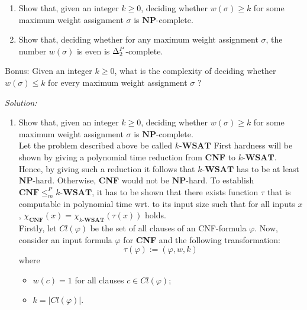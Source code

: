 \documentclass[11pt,a4paper]{article}
\newcommand{\NP}{\ensuremath{\mathbf{NP}}\xspace}
\newcommand{\DeltaP}[1]{\ensuremath{\Delta^{\protect{P}}_{#1}}\xspace}
\begin{document}
\begin{enumerate}
 \begin{enumerate}

       \item Show that, given an integer $k \geq 0$, deciding whether
            $w(\sigma)\geq k$ for some maximum weight assignment
                $\sigma$ is \NP-complete. 

                                
       \item Show that, deciding whether for any maximum weight assignment
                $\sigma$, the number $w(\sigma)$ is even is $\DeltaP{2}$-complete. 
                                
 \end{enumerate}

Bonus: Given an integer $k \geq 0$, what is the complexity of deciding whether
            $w(\sigma)\leq k$ for every maximum weight assignment
            $\sigma$ ?

 
 \bigskip

\emph{Solution:}           
           
             \begin{enumerate}

       \item Show that, given an integer $k \geq 0$, deciding whether
            $w(\sigma)\geq k$ for some maximum weight assignment
                $\sigma$ is \NP-complete. \\
       
Let the problem described above be called  $k\text{-}\textbf{WSAT}$
First hardness will be shown by giving a polynomial time reduction from {\bf CNF} to $k\text{-}\textbf{WSAT}$. Hence, by giving such a reduction it follows that $k\text{-}\textbf{WSAT}$ has to be at least \NP-hard. Otherwise, \textbf{CNF} would not be \NP-hard.
To establish $\textbf{CNF} \leq_m^P k\text{-}\textbf{WSAT}$, it has to be shown that there exists function $\tau$ that is computable in polynomial time wrt. to its input size such that for all inputs $x$, $\chi_{\textbf{CNF}} (x)= \chi_{k\text{-}\textbf{WSAT}}(\tau(x))$ holds. \\

Firstly, let $\mathit{Cl}(\varphi)$ be the set of all clauses of an CNF-formula $\varphi$. Now, consider an input formula $\varphi$ for \textbf{CNF} and the following transformation:
\begin{equation*}
\tau(\varphi):= (\varphi, w, k)
\end{equation*}
where 
\begin{itemize}
\item $w(c)=1$ for all clauses $c \in \mathit{Cl}(\varphi)$;
\item $k=| \mathit{Cl}(\varphi) |$.
\end{itemize}


\end{enumerate}
\end{enumerate}
\end{document}
